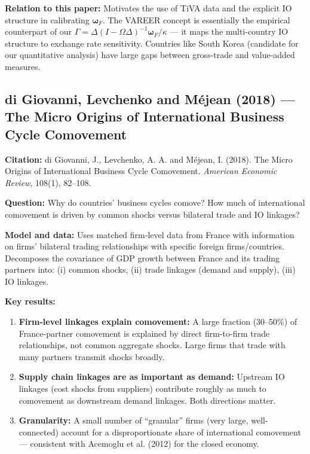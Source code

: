 \documentclass[12pt]{article}
\begin{document}
\textbf{Relation to this paper:} Motivates the use of TiVA data and the explicit IO structure in calibrating $\bm{\omega}_F$. The VAREER concept is essentially the empirical counterpart of our $\Gamma = \Delta(I-\Omega\Delta)^{-1}\bm{\omega}_F/\kappa$ --- it maps the multi-country IO structure to exchange rate sensitivity. Countries like South Korea (candidate for our quantitative analysis) have large gaps between gross-trade and value-added measures.

\subsection{di Giovanni, Levchenko and Méjean (2018) --- The Micro Origins of International Business Cycle Comovement}

\textbf{Citation:} di Giovanni, J., Levchenko, A. A. and Méjean, I. (2018). The Micro Origins of International Business Cycle Comovement. \textit{American Economic Review}, 108(1), 82--108.

\textbf{Question:} Why do countries' business cycles comove? How much of international comovement is driven by common shocks versus bilateral trade and IO linkages?

\textbf{Model and data:} Uses matched firm-level data from France with information on firms' bilateral trading relationships with specific foreign firms/countries. Decomposes the covariance of GDP growth between France and its trading partners into: (i) common shocks, (ii) trade linkages (demand and supply), (iii) IO linkages.

\textbf{Key results:}
\begin{enumerate}
    \item \textbf{Firm-level linkages explain comovement:} A large fraction (30--50\%) of France-partner comovement is explained by direct firm-to-firm trade relationships, not common aggregate shocks. Large firms that trade with many partners transmit shocks broadly.
    \item \textbf{Supply chain linkages are as important as demand:} Upstream IO linkages (cost shocks from suppliers) contribute roughly as much to comovement as downstream demand linkages. Both directions matter.
    \item \textbf{Granularity:} A small number of ``granular'' firms (very large, well-connected) account for a disproportionate share of international comovement --- consistent with Acemoglu et al. (2012) for the closed economy.
\end{enumerate}
\end{document}
